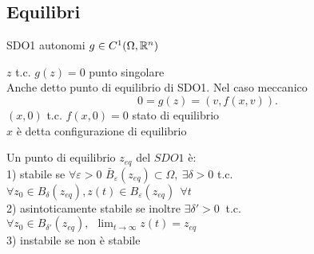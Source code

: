 \documentclass[12px]{article}
\begin{document}
	  \subsection{Equilibri}
	  SDO1 autonomi $g\in C^1(\Omega, \mathbb{R}^n)$\\
	   \begin{defi}
	  	$z$ t.c. $g(z) = 0$ punto singolare\\
		Anche detto punto di equilibrio di SDO1. Nel caso meccanico 
		 \[
		0 = g(z) = (v,f(x,v))
		.\] 
		$(x,0)$ t.c. $f(x,0) = 0$ stato di equilibrio\\
		 $x$ è detta configurazione di equilibrio
	  \end{defi}
	  \begin{defi}
		  Un punto di equilibrio $z_{eq}$ del $SDO1$ è:\\
		  1) stabile se  $\forall \varepsilon > 0 $  $\bar B_\varepsilon(z_{eq})\subset \Omega, \ \exists \delta > 0$ t.c. $\forall z_0\in B_\delta (z_{eq}), z(t)\in B_\varepsilon(z_{eq}) \ \ \forall t$ \\
		  2) asintoticamente stabile se inoltre $\exists \delta '>0 \ $ t.c.  $\forall z_0\in B_{\delta'}(z_{eq}), \ \ \lim_{t \rightarrow \infty} z(t) = z_{eq}$\\
		  3) instabile se non è stabile
	  \end{defi}
  
\end{document}
